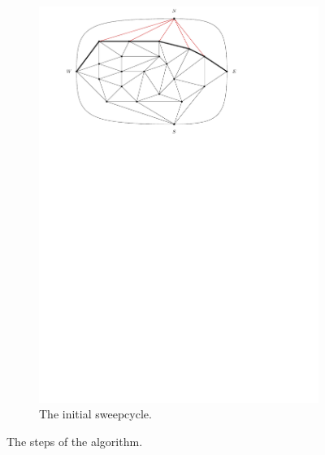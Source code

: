 \begin{figure}
\begin{subfigure}[b]{.9 \textwidth}
      \includegraphics[width=\textwidth]{examples/img/smallExample/smallExample-2}
      \caption{The initial sweepcycle.}
      \label{fig:ex:simple:2}
    \end{subfigure}
    \label{fig:ex:vert}
    \caption{The steps of the algorithm.}
\end{figure}

